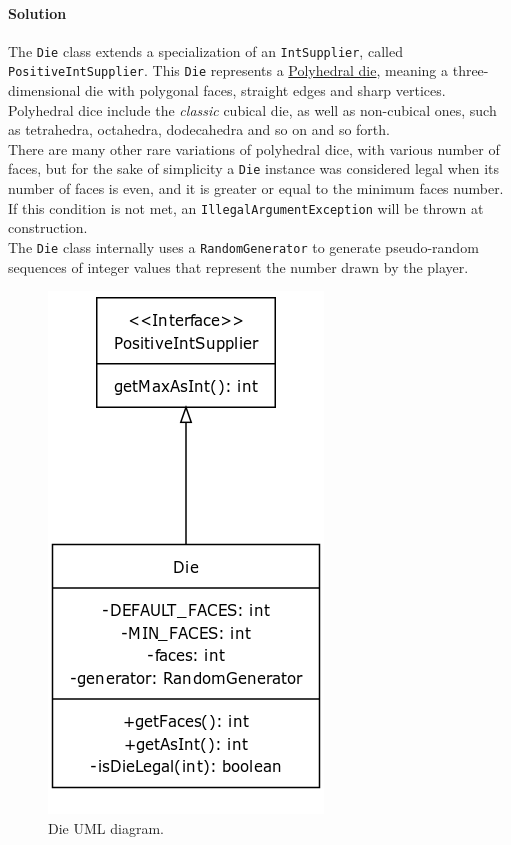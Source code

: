\documentclass[12pt, a4paper]{report}
\theoremstyle{definition}
\begin{document}
    \paragraph{Solution}
    The \verb|Die| class extends a specialization of an \verb|IntSupplier|, called \verb|PositiveIntSupplier|.
    This \verb|Die| represents a \href{https://en.wikipedia.org/wiki/Dice#Polyhedral_dice}{Polyhedral die}, meaning a
    three-dimensional die with polygonal faces, straight edges and sharp vertices.\\
    Polyhedral dice include the \textit{classic} cubical die, as well as non-cubical ones, such as tetrahedra, octahedra, dodecahedra
    and so on and so forth.\\
    There are many other rare variations of polyhedral dice, with various number of faces, but for the sake of simplicity
    a \verb|Die| instance was considered legal when its number of faces is even, and it is greater or equal to the minimum faces number.\\
    If this condition is not met, an \verb|IllegalArgumentException| will be thrown at construction.\\
    The \verb|Die| class internally uses a \verb|RandomGenerator| to generate pseudo-random sequences of integer values that represent
    the number drawn by the player.
    
    \begin{figure}[h]
    \centering{}
    \caption{Die UML diagram.}
    \includegraphics[scale=0.8]{die_uml}
    \end{figure}
\end{document}

